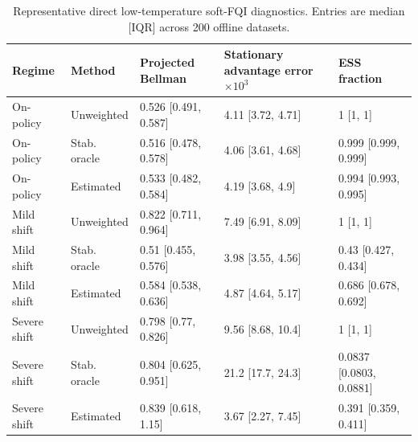 \begin{table}[t]
\centering
\caption{Representative direct low-temperature soft-FQI diagnostics. Entries are median [IQR] across 200 offline datasets.}
\label{tab:soft-fqi-main}
\small
\begin{tabular}{lllll}
\toprule
Regime & Method & Projected Bellman & Stationary advantage error $\times 10^3$ & ESS fraction \\
\midrule
On-policy & Unweighted & 0.526 [0.491, 0.587] & 4.11 [3.72, 4.71] & 1 [1, 1] \\
On-policy & Stab. oracle & 0.516 [0.478, 0.578] & 4.06 [3.61, 4.68] & 0.999 [0.999, 0.999] \\
On-policy & Estimated & 0.533 [0.482, 0.584] & 4.19 [3.68, 4.9] & 0.994 [0.993, 0.995] \\
Mild shift & Unweighted & 0.822 [0.711, 0.964] & 7.49 [6.91, 8.09] & 1 [1, 1] \\
Mild shift & Stab. oracle & 0.51 [0.455, 0.576] & 3.98 [3.55, 4.56] & 0.43 [0.427, 0.434] \\
Mild shift & Estimated & 0.584 [0.538, 0.636] & 4.87 [4.64, 5.17] & 0.686 [0.678, 0.692] \\
Severe shift & Unweighted & 0.798 [0.77, 0.826] & 9.56 [8.68, 10.4] & 1 [1, 1] \\
Severe shift & Stab. oracle & 0.804 [0.625, 0.951] & 21.2 [17.7, 24.3] & 0.0837 [0.0803, 0.0881] \\
Severe shift & Estimated & 0.839 [0.618, 1.15] & 3.67 [2.27, 7.45] & 0.391 [0.359, 0.411] \\
\bottomrule
\end{tabular}
\end{table}
